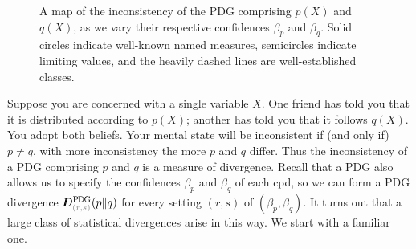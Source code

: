 \documentclass[twoside]{article}
\makeatletter
\theoremstyle{plain}
\theoremstyle{definition}
\newcommand{\thickD}{I\mkern-8muD}
\newcommand\aar{\@ifstar\aar@one@star\aar@plain}
\newcommand\aar@one@star{\@ifstar\aar@resize{\aar@plain*}}
\newcommand\aar@resize[1]{\sbox{\aar@content}{#1}\scaleleftright[3.8ex]
		{\Biggl\langle\!\!\!\!\Biggl\langle}{\usebox{\aar@content}}
		{\Biggr\rangle\!\!\!\!\Biggr\rangle}}
\makeatother
\begin{document}
\begin{figure*}
\begin{tikzpicture}[xscale=1.8, yscale=1.4]
	\end{tikzpicture}
	\caption{A map of the inconsistency of the PDG comprising $p(X)$ and $q(X)$, as we vary their respective confidences $\beta_p$ and $\beta_q$. Solid circles indicate well-known named measures, semicircles indicate limiting values, and the heavily dashed lines are well-established classes. }
	\label{fig:statdistmap}
\end{figure*}

Suppose you are concerned with a single variable $X$. One friend has told you that it is distributed according to $p(X)$; another has told you that it follows $q(X)$. You adopt both beliefs. Your mental state will be inconsistent if (and only if) $p \ne q$, with more inconsistency the more $p$ and $q$ differ.
Thus the inconsistency of a PDG comprising $p$ and $q$ is a measure of divergence.
%
%
Recall that a PDG also allows us to specify the confidences $\beta_p$
and $\beta_q$ of each cpd, so we can form a PDG divergence
$\thickD^{\mathrm{P\mskip-2muD\mskip-1.5muG}}_{{\color{gray}(r,s)}}(p\Vert q)$
for every setting $(r,s)$ of $(\beta_p, \beta_q)$.
It turns out that a large class of statistical divergences arise in this way.
We start with a familiar one.
\end{document}
